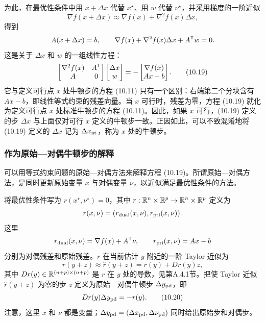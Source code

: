 为此，在最优性条件中用 $x+\Delta x$ 代替 $x^\star$、用 $w$ 代替 $\nu^\star$，并采用梯度的一阶近似
\[\nabla f(x+\Delta x)\approx\nabla f(x)+\nabla^2f(x)\Delta x,\]
得到
\[A(x+\Delta x)=b,\qquad\nabla f(x)+\nabla^2f(x)\Delta x+A^\mathsf T w=0.\]
这是关于 $\Delta x$ 和 $w$ 的一组线性方程：
\begin{equation}\begin{bmatrix}\nabla^2f(x)&A^\mathsf T\\A&0\end{bmatrix}\begin{bmatrix}\Delta x\\w\end{bmatrix}=-\begin{bmatrix}\nabla f(x)\\Ax-b\end{bmatrix}.\tag{10.19}\end{equation}
它与定义可行点 $x$ 处牛顿步的方程 (10.11) 只有一个区别：右端第二个分块含有 $Ax-b$，即线性等式约束的残差向量。当 $x$ 可行时，残差为零，方程 (10.19) 就化为定义可行点 $x$ 处标准牛顿步的方程 (10.11)。因此，如果 $x$ 可行，(10.19) 定义的步 $\Delta x$ 与上面仅对可行 $x$ 定义的牛顿步一致。正因如此，可以不致混淆地将 (10.19) 定义的 $\Delta x$ 记为 $\Delta x_{\rm nt}$，称为 $x$ 处的牛顿步。

\subsubsection*{作为原始—对偶牛顿步的解释}
可以用等式约束问题的原始—对偶方法来解释方程 (10.19)。所谓原始—对偶方法，是同时更新原始变量 $x$ 与对偶变量 $\nu$，以近似满足最优性条件的方法。

将最优性条件写为 $r(x^\star,\nu^\star)=0$，其中 $r:\mathbb R^n\times\mathbb R^p\to\mathbb R^n\times\mathbb R^p$ 定义为
\[r(x,\nu)=(r_{\rm dual}(x,\nu),r_{\rm pri}(x,\nu)).\]
这里
\[r_{\rm dual}(x,\nu)=\nabla f(x)+A^\mathsf T\nu,\qquad r_{\rm pri}(x,\nu)=Ax-b\]
分别为对偶残差和原始残差。$r$ 在当前估计 $y$ 附近的一阶 Taylor 近似为
\[r(y+z)\approx\widehat r(y+z)=r(y)+Dr(y)z,\]
其中 $Dr(y)\in\mathbb R^{(n+p)\times(n+p)}$ 是 $r$ 在 $y$ 处的导数，见第A.4.1节。把使 Taylor 近似 $\widehat r(y+z)$ 为零的步 $z$ 定义为原始—对偶牛顿步 $\Delta y_{\rm pd}$，即
\begin{equation}Dr(y)\Delta y_{\rm pd}=-r(y).\tag{10.20}\end{equation}
注意，这里 $x$ 和 $\nu$ 都是变量；$\Delta y_{\rm pd}=(\Delta x_{\rm pd},\Delta\nu_{\rm pd})$ 同时给出原始步和对偶步。

